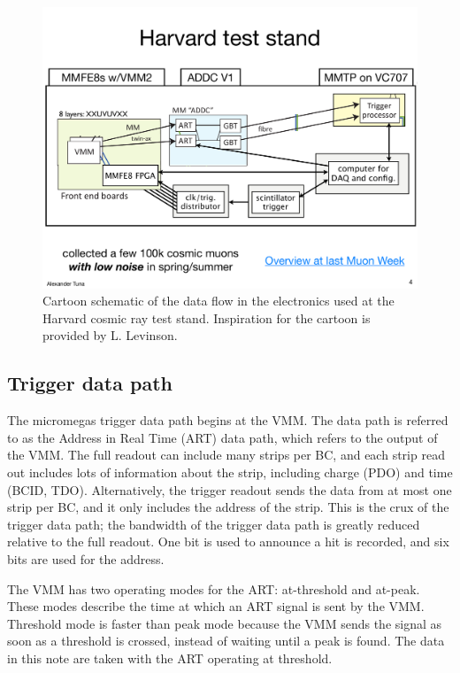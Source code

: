 \begin{figure}[!htpb]
  \begin{center}
    \includegraphics[width=1.0\textwidth]{figures/cartoons/electronics_path.pdf}
  \end{center}
  \vspace{-20pt}
  \caption{Cartoon schematic of the data flow in the electronics used at the Harvard cosmic ray test stand. Inspiration for the cartoon is provided by L. Levinson.}
  \label{fig:cartoon_elx}
\end{figure}

\subsection{Trigger data path}
\label{sec:exp-art}

The micromegas trigger data path begins at the VMM. The data path is referred to as the Address in Real Time (ART) data path, which refers to the output of the VMM. The full readout can include many strips per BC, and each strip read out includes lots of information about the strip, including charge (PDO) and time (BCID, TDO). Alternatively, the trigger readout sends the data from at most one strip per BC, and it only includes the address of the strip. This is the crux of the trigger data path; the bandwidth of the trigger data path is greatly reduced relative to the full readout. One bit is used to announce a hit is recorded, and six bits are used for the address.

The VMM has two operating modes for the ART: at-threshold and at-peak. These modes describe the time at which an ART signal is sent by the VMM. Threshold mode is faster than peak mode because the VMM sends the signal as soon as a threshold is crossed, instead of waiting until a peak is found. The data in this note are taken with the ART operating at threshold.

